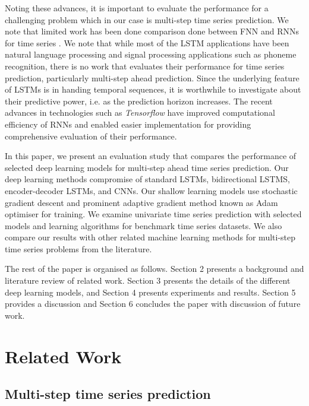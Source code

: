 \documentclass[final,5p,times,twocolumn]{elsarticle}
\begin{document}
Noting these advances, it is important to evaluate the performance for a challenging problem which in our case is multi-step time series prediction. 
 We note that limited work has been done comparison done between FNN and RNNs for time series \cite{koskela1996time,chandra2016evaluation}. We note that while most of the LSTM applications have been natural language processing and signal processing applications such as phoneme recognition, there is no work that evaluates their performance for time series prediction, particularly multi-step ahead prediction. Since the underlying feature of LSTMs is in handing temporal sequences, it is worthwhile to investigate about their predictive power, i.e. as the prediction horizon increases.  The recent advances in technologies such as \textit{Tensorflow} have   improved computational efficiency of RNNs  \cite{abadi2016tensorflow} and enabled easier implementation for providing comprehensive evaluation of their performance. 
 
 
In this paper, we present an evaluation study that compares the performance  of selected   deep learning models  for multi-step ahead time series prediction.  Our deep learning methods compromise of   standard LSTMs, bidirectional  LSTMS,    encoder-decoder LSTMs, and CNNs. Our shallow learning models use stochastic gradient descent and prominent adaptive gradient method known as Adam optimiser for training. We   examine univariate  time series prediction  with selected models and learning algorithms for benchmark time series datasets. We also compare our results with other related machine learning methods for multi-step time series problems from the literature. 
 
 

The rest of the paper is organised as follows. Section 2 presents a background and literature review of related work. Section 3 presents the details of the different deep learning models,  and Section 4 presents experiments and results. Section 5 provides a discussion and Section 6 concludes the paper with discussion of future work. 

\section{Related Work} 

\subsection{Multi-step time series prediction}
\end{document}
